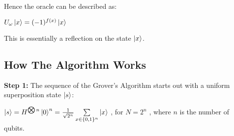 \documentclass{article}
\begin{document}
Hence the oracle can be described as:
\vspace{5mm}

\qquad $U_\omega\ket{x} = (-1)^{f(x)} \ket{x}$
\vspace{5mm}

This is essentially a reflection on the state $\ket{x}$.

\pagebreak

\subsection{How The Algorithm Works}
\vspace{5mm}

\textbf{Step 1:}
\vspace{5mm}
\noindent
The sequence of the Grover's Algorithm starts out with a uniform superposition state $\ket{s}$\cite{noauthor_grovers_nodate}:
\vspace{5mm}

\qquad $ \ket{s}= H^{\bigotimes n} \ket{0}^n = \frac{1}{\sqrt{2^n}}\sum\limits_{x \in \{0,1\}^n}\ket{x} $ , \qquad for $N = 2^n$ , where $n$ is the number of qubits.
\vspace{5mm}
\end{document}
